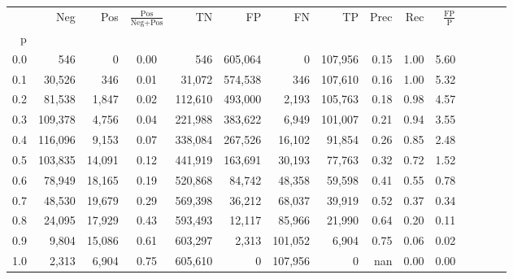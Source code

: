 \begin{tabular}{rrrcrrrrrrrrrrr}
\toprule
{} &      Neg &     Pos & $\frac{\text{Pos}}{\text{Neg}+\text{Pos}}$ &       TN &       FP &       FN &       TP &  Prec &   Rec & $\frac{\text{FP}}{\text{P}}$ \\
p   &          &         &                                            &          &          &          &          &       &       &                              \\
\midrule
0.0 &      546 &       0 &                                       0.00 &      546 &  605,064 &        0 &  107,956 &  0.15 &  1.00 &                         5.60 \\
0.1 &   30,526 &     346 &                                       0.01 &   31,072 &  574,538 &      346 &  107,610 &  0.16 &  1.00 &                         5.32 \\
0.2 &   81,538 &   1,847 &                                       0.02 &  112,610 &  493,000 &    2,193 &  105,763 &  0.18 &  0.98 &                         4.57 \\
0.3 &  109,378 &   4,756 &                                       0.04 &  221,988 &  383,622 &    6,949 &  101,007 &  0.21 &  0.94 &                         3.55 \\
0.4 &  116,096 &   9,153 &                                       0.07 &  338,084 &  267,526 &   16,102 &   91,854 &  0.26 &  0.85 &                         2.48 \\
0.5 &  103,835 &  14,091 &                                       0.12 &  441,919 &  163,691 &   30,193 &   77,763 &  0.32 &  0.72 &                         1.52 \\
0.6 &   78,949 &  18,165 &                                       0.19 &  520,868 &   84,742 &   48,358 &   59,598 &  0.41 &  0.55 &                         0.78 \\
0.7 &   48,530 &  19,679 &                                       0.29 &  569,398 &   36,212 &   68,037 &   39,919 &  0.52 &  0.37 &                         0.34 \\
0.8 &   24,095 &  17,929 &                                       0.43 &  593,493 &   12,117 &   85,966 &   21,990 &  0.64 &  0.20 &                         0.11 \\
0.9 &    9,804 &  15,086 &                                       0.61 &  603,297 &    2,313 &  101,052 &    6,904 &  0.75 &  0.06 &                         0.02 \\
1.0 &    2,313 &   6,904 &                                       0.75 &  605,610 &        0 &  107,956 &        0 &   nan &  0.00 &                         0.00 \\
\bottomrule
\end{tabular}
